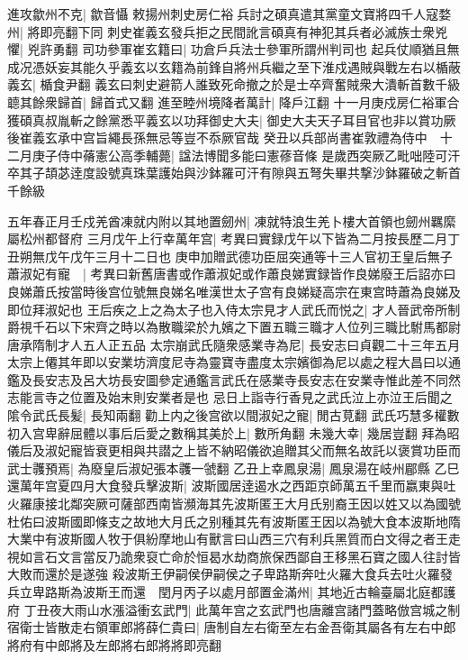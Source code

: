 進攻歙州不克|{
	歙音懾}
敕揚州刺史房仁裕兵討之碩真遣其黨童文寶將四千人寇婺州|{
	將即亮翻下同}
刺史崔義玄發兵拒之民間訛言碩真有神犯其兵者必滅族士衆兇懼|{
	兇許勇翻}
司功參軍崔玄籍曰|{
	功倉戶兵法士參軍所謂州判司也}
起兵仗順猶且無成况憑妖妄其能久乎義玄以玄籍為前鋒自將州兵繼之至下淮戍遇賊與戰左右以楯蔽義玄|{
	楯食尹翻}
義玄曰刺史避箭人誰致死命撤之於是士卒齊奮賊衆大潰斬首數千級聼其餘衆歸首|{
	歸首式又翻}
進至睦州境降者萬計|{
	降戶江翻}
十一月庚戍房仁裕軍合獲碩真叔胤斬之餘黨悉平義玄以功拜御史大夫|{
	御史大夫天子耳目官也非以賞功厥後崔義玄承中宫旨繩長孫無忌等豈不忝厥官哉}
癸丑以兵部尚書崔敦禮為侍中　十二月庚子侍中蓨憲公高季輔薨|{
	諡法博聞多能曰憲蓚音條}
是歲西突厥乙毗咄陸可汗卒其子頡苾逹度設號真珠葉護始與沙鉢羅可汗有隙與五弩失畢共撃沙鉢羅破之斬首千餘級

五年春正月壬戍羌酋凍就内附以其地置劒州|{
	凍就特浪生羌卜樓大首領也劒州羈縻屬松州都督府}
三月戊午上行幸萬年宫|{
	考異曰實録戊午以下皆為二月按長歷二月丁丑朔無戊午戊午三月十二日也}
庚申加贈武德功臣屈突通等十三人官初王皇后無子蕭淑妃有寵　|{
	考異曰新舊唐書或作蕭淑妃或作蕭良娣實録皆作良娣廢王后詔亦曰良娣蕭氏按當時後宫位號無良娣名唯漢世太子宫有良娣疑高宗在東宫時蕭為良娣及即位拜淑妃也}
王后疾之上之為太子也入侍太宗見才人武氏而悦之|{
	才人晉武帝所制爵視千石以下宋齊之時以為散職梁於九嬪之下置五職三職才人位列三職比駙馬都尉唐承隋制才人五人正五品}
太宗崩武氏隨衆感業寺為尼|{
	長安志曰貞觀二十三年五月太宗上僊其年即以安業坊濟度尼寺為靈寶寺盡度太宗嬪御為尼以處之程大昌曰以通鑑及長安志及呂大坊長安圖參定通鑑言武氏在感業寺長安志在安業寺惟此差不同然志能言寺之位置及始末則安業者是也}
忌日上詣寺行香見之武氏泣上亦泣王后聞之隂令武氏長髪|{
	長知兩翻}
勸上内之後宫欲以間淑妃之寵|{
	閒古莧翻}
武氏巧慧多權數初入宫卑辭屈體以事后后愛之數稱其美於上|{
	數所角翻}
未幾大幸|{
	幾居豈翻}
拜為昭儀后及淑妃寵皆衰更相與共譛之上皆不納昭儀欲追贈其父而無名故託以褒賞功臣而武士彠預焉|{
	為廢皇后淑妃張本彠一虢翻}
乙丑上幸鳳泉湯|{
	鳳泉湯在岐州郿縣}
乙巳還萬年宫夏四月大食發兵擊波斯|{
	波斯國居逹遏水之西距京師萬五千里而嬴東與吐火羅康接北鄰突厥可薩部西南皆瀕海其先波斯匿王大月氏别裔王因以姓又以為國號杜佑曰波斯國即條支之故地大月氏之别種其先有波斯匿王因以為號大食本波斯地隋大業中有波斯國人牧于俱紛摩地山有獸言曰山西三穴有利兵黑質而白文得之者王走視如言石文言當反乃詭衆裒亡命於恒曷水劫商旅保西鄙自王移黑石寶之國人往討皆大敗而還於是遂強}
殺波斯王伊嗣侯伊嗣侯之子卑路斯奔吐火羅大食兵去吐火羅發兵立卑路斯為波斯王而還　閏月丙子以處月部置金滿州|{
	其地近古輪臺屬北庭都護府}
丁丑夜大雨山水漲溢衝玄武門|{
	此萬年宫之玄武門也唐離宫諸門蓋略倣宫城之制}
宿衛士皆散走右領軍郎將薛仁貴曰|{
	唐制自左右衛至左右金吾衛其屬各有左右中郎將府有中郎將及左郎將右郎將將即亮翻}
